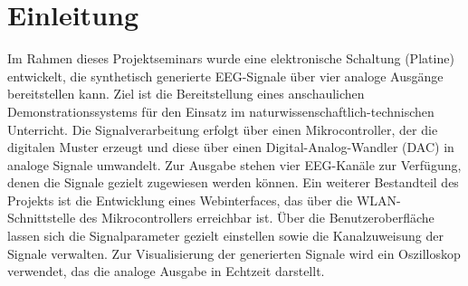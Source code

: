 \chapter{Einleitung}
\label{einleitung}

Im Rahmen dieses Projektseminars wurde eine elektronische Schaltung (Platine) entwickelt, die synthetisch generierte EEG-Signale über vier analoge Ausgänge bereitstellen kann.
Ziel ist die Bereitstellung eines anschaulichen Demonstrationssystems für den Einsatz im naturwissenschaftlich-technischen Unterricht.
Die Signalverarbeitung erfolgt über einen Mikrocontroller, der die digitalen Muster erzeugt und diese über einen Digital-Analog-Wandler (DAC) in analoge Signale umwandelt.
Zur Ausgabe stehen vier EEG-Kanäle zur Verfügung, denen die Signale gezielt zugewiesen werden können.
Ein weiterer Bestandteil des Projekts ist die Entwicklung eines Webinterfaces, das über die WLAN-Schnittstelle des Mikrocontrollers erreichbar ist.
Über die Benutzeroberfläche lassen sich die Signalparameter gezielt einstellen sowie die Kanalzuweisung der Signale verwalten.
Zur Visualisierung der generierten Signale wird ein Oszilloskop verwendet, das die analoge Ausgabe in Echtzeit darstellt.